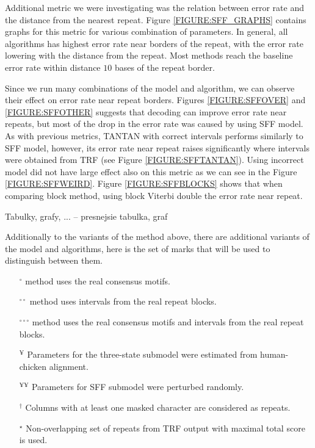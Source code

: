 Additional metric we were investigating was the relation between error rate and
the distance from the nearest repeat. Figure \ref{FIGURE:SFF_GRAPHS} contains
graphs for this metric for various combination of parameters. In general, all
algorithms has highest error rate near borders of the repeat, with the error
rate lowering with the distance from the repeat. Most methods reach the
baseline error rate within distance $10$ bases of the repeat border.

Since we run many combinations of the model and algorithm, we can observe their
effect on error rate near repeat borders. Figures \ref{FIGURE:SFFOVER} and
\ref{FIGURE:SFFOTHER} suggests that decoding can improve error rate near
repeats, but most of the drop in the error rate was caused by using SFF model.
As with previous metrics, TANTAN with correct intervals performs similarly to
SFF model, however, its error rate near repeat raises significantly where
intervals were obtained from TRF (see Figure \ref{FIGURE:SFFTANTAN}). Using
incorrect model did not have large effect also on this metric as we can see in
the Figure \ref{FIGURE:SFFWEIRD}. Figure \ref{FIGURE:SFFBLOCKS} shows that when
comparing block method, using block Viterbi double the error rate near repeat.


\begin{reformulate*}
Tabulky, grafy, ... -- presnejsie tabulka, graf
\end{reformulate*}
\def\M{$^\circ$} %
\def\MM{$^{\circ\circ\circ}$} %
\def\D{$^{\circ\circ}$} %
\def\DD{$^{\dagger}$} %
\def\R{$^{\yen}$}
\def\RR{$^{\yen\yen}$}
\def\CC#1{\multicolumn{1}{c}{#1}} %
\def\S{$^{\star}$}
Additionally to the variants of the method above, there are additional variants
of the model and algorithms, here is the set of marks that will be used to
distinguish between them.

\begin{itemize}[itemsep=-1mm]

\item[\M] method uses the real consensus motifs. 

\item[\D] method uses intervals from the real repeat blocks.

\item[\MM] method uses the real consensus motifs and intervals from the real
repeat blocks.

\item[\R] Parameters for the three-state submodel were estimated from
human-chicken alignment. 

\item[\RR] Parameters for SFF submodel were perturbed randomly.

\item[\DD] Columns with at least one masked character are considered as
repeats.

\item[\S] Non-overlapping set of repeats from TRF output with maximal total
score is used.

\end{itemize}

